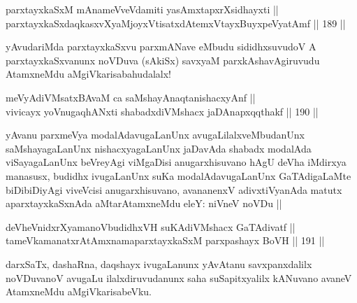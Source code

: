 \begin{shl}
parxtayxkaSxM mAnameVveVdamiti yasAmxtapxrXsidhayxti || \\
parxtayxkaSxdaqkasxvXyaMjoyxVtisatxdAtemxVtayxBuyxpeVyatAmf ||  189 ||  
\end{shl}

\begin{artha}
yAvudariMda parxtayxkaSxvu parxmANave eMbudu sididhxsuvudoV A parxtayxkaSxvanunx noVDuva (sAkiSx) savxyaM parxkAshavAgiruvudu AtamxneMdu aMgiVkarisabahudalalx! 
\end{artha}

\begin{shl}
meVyAdiVMsatxBAvaM ca saMshayAnaqtanishacxyAnf || \\
vivicayx yoV\s nugaqhANxti shabadxdiVMshacx jaDAnapxqqthakf ||  190 ||  
\end{shl}

\begin{artha}
yAvanu parxmeVya modalAdavugaLanUnx avugaLilalxveMbudanUnx saMshayagaLanUnx nishacxyagaLanUnx jaDavAda shabadx modalAda viSayagaLanUnx beVreyAgi viMgaDisi anugarxhisuvano hAgU deVha iMdirxya manasusx, budidhx ivugaLanUnx suKa modalAdavugaLanUnx GaTAdigaLaMte biDibiDiyAgi viveVcisi anugarxhisuvano, avananenxV adivxtiVyanAda matutx aparxtayxkaSxnAda aMtarAtamxneMdu eleY: niVneV noVDu ||
\end{artha}

\begin{shl}
deVheVnidxrXyamanoVbudidhxVH suKAdiVMshacx GaTAdivatf || \\
tameVkamanatxrAtAmxnamaparxtayxkaSxM parxpashayx BoVH ||  191 ||  
\end{shl}

\begin{artha}
darxSaTx, dashaRna, daqshayx ivugaLanunx yAvAtanu savxpanxdalilx noVDuvanoV avugaLu ilalxdiruvudanunx saha suSapitxyalilx kANuvano avaneV AtamxneMdu aMgiVkarisabeVku.
\end{artha}

